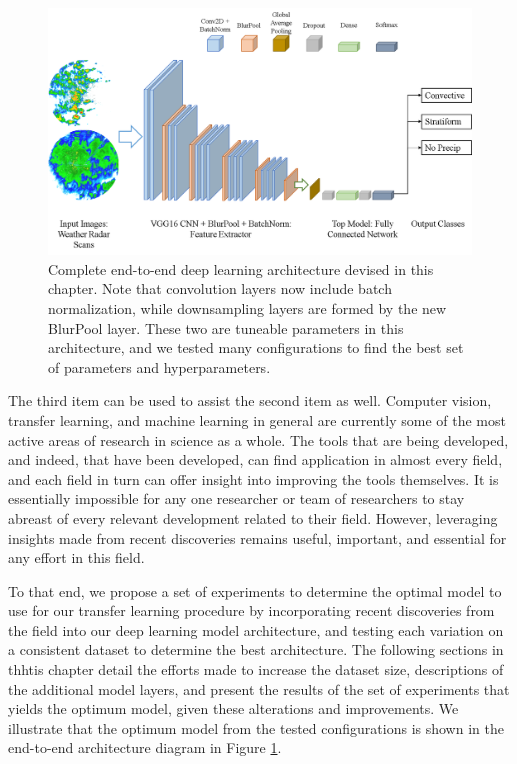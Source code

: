 \begin{figure}[t]
	\centering
	\includegraphics[width=\textwidth]{./thesis_code/plots/DL-workflow.png}
	\caption{Complete end-to-end deep learning architecture devised in this chapter. Note that convolution layers now include batch normalization, while downsampling layers are formed by the new BlurPool layer. These two are tuneable parameters in this architecture, and we tested many configurations to find the best set of parameters and hyperparameters.}
	\label{fig:end-to-end}
\end{figure}

The third item can be used to assist the second item as well. Computer vision, transfer learning, and machine learning in general are currently some of the most active areas of research in science as a whole.
The tools that are being developed, and indeed, that have been developed, can find application in almost every field, and each field in turn can offer insight into improving the tools themselves.
It is essentially impossible for any one researcher or team of researchers to stay abreast of every relevant development related to their field.
However, leveraging insights made from recent discoveries remains useful, important, and essential for any effort in this field.

To that end, we propose a set of experiments to determine the optimal model to use for our transfer learning procedure by incorporating recent discoveries from the field into our deep learning model architecture, and testing each variation on a consistent dataset to determine the best architecture.
The following sections in thhtis chapter detail the efforts made to increase the dataset size, descriptions of the additional model layers, and present the results of the set of experiments that yields the optimum model, given these alterations and improvements.
We illustrate that the optimum model from the tested configurations is shown in the end-to-end architecture diagram in Figure \ref{fig:end-to-end}.

